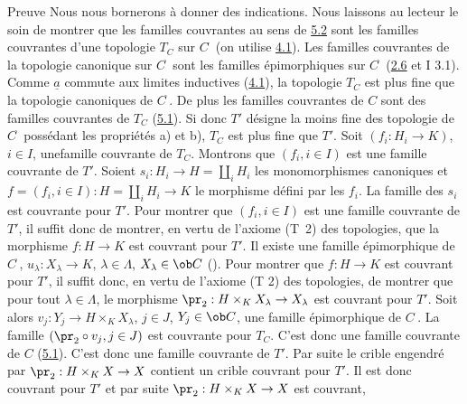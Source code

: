 \begin{enonce*}[remark]{Preuve}
Nous nous bornerons à donner des indications. Nous laissons au
lecteur le soin de montrer que les familles couvrantes au sens de
\hyperref[II.def5.2]{5.2} sont les familles couvrantes d'une topologie $T_C$
sur $C^{\widehat{\phantom{,}}}$ (on utilise \hyperref[II.theo4.1]{4.1}). Les
familles couvrantes de la topologie canonique sur
$C^{\widehat{\phantom{,}}}$ sont les familles épimorphiques sur
$C^{\widehat{\phantom{,}}}$ (\hyperref[II.prop2.6]{2.6} et I 3.1). Comme
$\underline{a}$ commute aux limites inductives (\hyperref[II.theo4.1]{4.1}), la
topologie $T_C$ est plus fine que la topologie canoniques de
$C^{\widehat{\phantom{,}}}$. De plus les familles couvrantes de $C$
sont des familles couvrantes de $T_C$ (\hyperref[II.prop5.1]{5.1}). Si donc
$T'$ désigne la moins fine des topologie de
$C^{\widehat{\phantom{,}}}$ possédant les propriétés a) et b), $T_C$
est plus fine que $T'$. Soit $(f_i:H_i\rightarrow K)$, $i\in I$,
une\pageoriginale famille couvrante de $T_C$. Montrons que
$(f_i,i\in I)$ est une famille couvrante de $T'$. Soient
$s_i:H_i\rightarrow H=\amalg_i H_i$ les monomorphismes canoniques et
$f=(f_i,i\in I):H=\amalg_i H_i\rightarrow K$ le morphisme défini par
les $f_i$. La famille des $s_i$ est couvrante pour $T'$. Pour
montrer que $(f_i,i\in I)$ est une famille couvrante de $T'$, il
suffit donc de montrer, en vertu de l'axiome (T~2) des topologies,
que la morphisme $f:H\rightarrow K$ est couvrant pour $T'$. Il
existe une famille épimorphique de $C^{\widehat{\phantom{,}}}$,
$u_{\lambda}:X_{\lambda}\rightarrow K$, $\lambda\in \Lambda$,
$X_{\lambda}\in \ob C$ (). Pour montrer que
$f:H\rightarrow K$ est couvrant pour $T'$, il suffit donc, en vertu
de l'axiome (T 2) des topologies, de montrer que pour tout
$\lambda\in \Lambda$, le morphisme $\pr_2:H\times_K
X_{\lambda}\rightarrow X_{\lambda}$ est couvrant pour $T'$. Soit
alors $v_j:Y_j\rightarrow H\times_K X_{\lambda}$, $j\in J$, $Y_j\in
\ob C$, une famille épimorphique de $C^{\widehat{\phantom{,}}}$. La
famille $(\pr_2\circ v_j, j\in J)$ est couvrante pour $T_{C}$. C'est
donc une famille couvrante de $C$ (\hyperref[II.prop5.1]{5.1}). C'est donc une
famille couvrante de $T'$. Par suite le crible engendré par
$\pr_2:H\times_K X\rightarrow X$ contient un crible couvrant pour
$T'$. Il est donc couvrant pour $T'$ et par suite $\pr_2:H\times_K
X\rightarrow X$ est couvrant, \cqfd
\end{enonce*}

